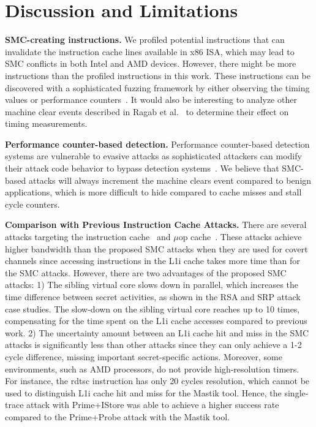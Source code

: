\section{Discussion and Limitations}\label{sec:discussion}

\noindent\textbf{SMC-creating instructions.} We profiled potential instructions that can invalidate the instruction cache lines available in x86 ISA, which may lead to SMC conflicts in both Intel and AMD devices. However, there might be more instructions than the profiled instructions in this work. These instructions can be discovered with a sophisticated fuzzing framework by either observing the timing values or performance counters~\cite{weber2021osiris}. It would also be interesting to analyze other machine clear events described in Ragab et al.~\cite{ragab2021rage} to determine their effect on timing measurements.

\noindent\textbf{Performance counter-based detection.} Performance counter-based detection systems are vulnerable to evasive attacks as sophisticated attackers can modify their attack code behavior to bypass detection systems~\cite{kosasihsok}. We believe that SMC-based attacks will always increment the machine clears event compared to benign applications, which is more difficult to hide compared to cache misses and stall cycle counters.

\noindent\textbf{Comparison with Previous Instruction Cache Attacks.} There are several attacks targeting the instruction cache~\cite{aciiccmez2007yet,aciiccmez2010new,yarom2016mastik} and $\mu$op cache~\cite{kim2021uc,ren2021see}. These attacks achieve higher bandwidth than the proposed SMC attacks when they are used for covert channels since accessing instructions in the L1i cache takes more time than for the SMC attacks. However, there are two advantages of the proposed SMC attacks: 1) The sibling virtual core slows down in parallel, which increases the time difference between secret activities, as shown in the RSA and SRP attack case studies. The slow-down on the sibling virtual core reaches up to 10 times, compensating for the time spent on the L1i cache accesses compared to previous work. 2) The uncertainty amount between an L1i cache hit and miss in the SMC attacks is significantly less than other attacks since they can only achieve a 1-2 cycle difference, missing important secret-specific actions. Moreover, some environments, such as AMD processors, do not provide high-resolution timers. For instance, the rdtsc instruction has only 20 cycles resolution, which cannot be used to distinguish L1i cache hit and miss for the Mastik tool. Hence, the single-trace attack with Prime+IStore was able to achieve a higher success rate compared to the Prime+Probe attack with the Mastik tool.